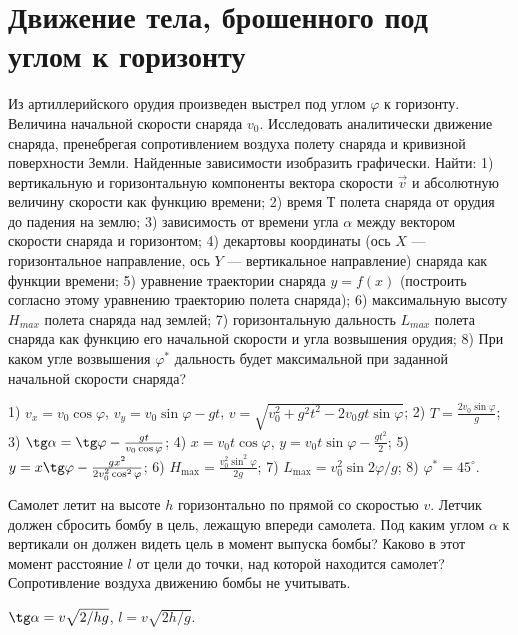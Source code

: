\section{Движение тела, брошенного под углом к горизонту}

\begin{ex} %
Из артиллерийского орудия произведен выстрел под углом $\varphi$ к горизонту. Величина начальной скорости снаряда $v_0$. Исследовать аналитически движение снаряда, пренебрегая сопротивлением воздуха полету снаряда и кривизной поверхности Земли. Найденные зависимости изобразить графически. Найти: 1) вертикальную и горизонтальную компоненты вектора скорости $\vec{v}$ и абсолютную величину скорости как функцию времени; 2) время $Т$ полета снаряда от орудия до падения на землю; 3) зависимость от времени угла $\alpha$ между вектором скорости снаряда и горизонтом; 4) декартовы координаты (ось $X$ — горизонтальное направление, ось $Y$ — вертикальное направление) снаряда как функции времени; 5) уравнение траектории снаряда $y = f(x)$ (построить согласно этому уравнению траекторию полета снаряда); 6) максимальную высоту $H_{max}$ полета снаряда над землей; 7) горизонтальную дальность $L_{max}$ полета снаряда как функцию его начальной скорости и угла возвышения орудия; 8) При каком угле возвышения $\varphi^*$ дальность будет максимальной при заданной начальной скорости снаряда?
\begin{ans}
1) $v_x = v_0 \cos \varphi$, $v_y = v_0 \sin \varphi - gt$, $v = \sqrt{v_{0}^{2} + g^2 t^2 - 2v_{0}gt \sin \varphi}$; 2) $T = \frac{2v_{0}\sin \varphi}{g}$; 3) $ \tg \alpha = \tg \varphi - \frac{gt}{v_0 \cos \varphi}$; 4) $x = v_0 t \cos \varphi$, $y = v_0 t \sin \varphi - \frac{gt^2}{2}$; 5) $y = x \tg \varphi - \frac{gx^2}{2v_{0}^{2} \cos^2 \varphi} $; 6) $H_{\max} = \frac{v_{0}^{2} \sin^2 \varphi}{2g}$; 7) $L_{\max} = v_{0}^2 \sin 2 \varphi / g$; 8) $\varphi^{*} = 45^{\circ}$.
\end{ans}
\end{ex}	

\begin{ex} %
Самолет летит на высоте $h$ горизонтально по прямой со скоростью $v$. Летчик должен сбросить бомбу в цель, лежащую впереди самолета. Под каким углом $\alpha$ к вертикали он должен видеть цель в момент выпуска бомбы? Каково в этот момент расстояние $l$ от цели до точки, над которой находится самолет? Сопротивление воздуха движению бомбы не учитывать.
\begin{ans}
$\tg \alpha = v \sqrt{2/hg}$, $l = v \sqrt{2h/g}$.
\end{ans}
\end{ex}	

